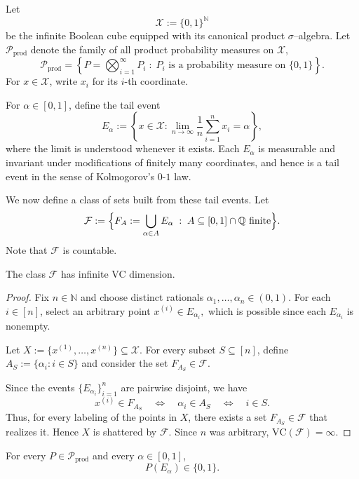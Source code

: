 \documentclass[arxiv]{colt2026}
\newcommand{\X}{\mathcal{X}}
\newcommand{\F}{\mathcal{F}}
\newcommand{\Pc}{\mathcal{P}}
\newcommand{\VC}{\mathrm{VC}}
\begin{document}
\medskip

Let
\[
\X := \{0,1\}^{\mathbb{N}}
\]
be the infinite Boolean cube equipped with its canonical product
$\sigma$--algebra.
Let $\Pc_{\mathrm{prod}}$ denote the family of all product probability measures
on $\X$,
\[
\Pc_{\mathrm{prod}}
=
\left\{
  P = \bigotimes_{i=1}^{\infty} P_i
  \;:\;
  P_i \text{ is a probability measure on } \{0,1\}
\right\}.
\]
For $x\in\X$, write $x_i$ for its $i$-th coordinate.

\medskip

For $\alpha\in[0,1]$, define the tail event
\[
E_\alpha
:=
\left\{
  x\in\X :
  \lim_{n\to\infty}\frac{1}{n}\sum_{i=1}^n x_i = \alpha
\right\},
\]
where the limit is understood whenever it exists.
Each $E_\alpha$ is measurable and invariant under modifications of finitely many
coordinates, and hence is a tail event in the sense of Kolmogorov's $0$-$1$ law.

We now define a class of sets built from these tail events.
Let
\[
\F
:=
\Bigl\{
  F_A := \bigcup_{\alpha\in A} E_\alpha
  \;:\;
  A \subseteq [0,1]\cap\mathbb{Q} \text{ finite}
\Bigr\}.
\]
Note that $\F$ is countable.

\begin{lemma}
\label{lem:tail-vc-infinite}
The class $\F$ has infinite VC dimension.
\end{lemma}

\begin{proof}
Fix $n\in\mathbb{N}$ and choose distinct rationals
$\alpha_1,\ldots,\alpha_n\in(0,1)$.
For each $i\in[n]$, select an arbitrary point
\(
x^{(i)} \in E_{\alpha_i},
\)
which is possible since each $E_{\alpha_i}$ is nonempty.

Let $X := \{x^{(1)},\ldots,x^{(n)}\}\subseteq\X$.
For every subset $S\subseteq[n]$, define
\(
A_S := \{\alpha_i : i\in S\}
\)
and consider the set $F_{A_S}\in\F$.

Since the events $\{E_{\alpha_i}\}_{i=1}^n$ are pairwise disjoint, we have
\[
x^{(i)} \in F_{A_S}
\quad\Longleftrightarrow\quad
\alpha_i\in A_S
\quad\Longleftrightarrow\quad
i\in S.
\]
Thus, for every labeling of the points in $X$, there exists a set
$F_{A_S}\in\F$ that realizes it.
Hence $X$ is shattered by $\F$.
Since $n$ was arbitrary, $\VC(\F)=\infty$.
\end{proof}

\begin{lemma}
\label{lem:tail-01}
For every $P\in\Pc_{\mathrm{prod}}$ and every $\alpha\in[0,1]$,
\[
P(E_\alpha)\in\{0,1\}.
\]
\end{lemma}
\end{document}
